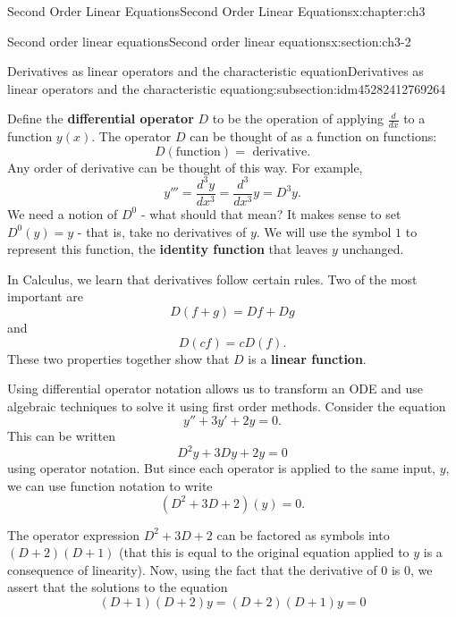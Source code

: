 \documentclass[oneside,10pt,]{book}
\newcommand{\terminology}[1]{\textbf{#1}}
\numberwithin{equation}{section}
\numberwithin{equation}{section}
\begin{document}
\begin{chapterptx}{Second Order Linear Equations}{}{Second Order Linear Equations}{}{}{x:chapter:ch3}
\begin{sectionptx}{Second order linear equations}{}{Second order linear equations}{}{}{x:section:ch3-2}
\begin{subsectionptx}{Derivatives as linear operators and the characteristic equation}{}{Derivatives as linear operators and the characteristic equation}{}{}{g:subsection:idm45282412769264}
\par
Define the \terminology{differential operator} \(D\) to be the operation of applying \(\frac{d}{dx}\) to a function \(y(x)\). The operator \(D\) can be thought of as a function on functions:%
\begin{equation*}
D(\text{function}) = \text{ derivative}.
\end{equation*}
Any order of derivative can be thought of this way. For example,%
\begin{equation*}
y''' = \frac{d^3 y}{dx^3} = \frac{d^3}{dx^3} y = D^3 y.
\end{equation*}
We need a notion of \(D^0\) - what should that mean? It makes sense to set \(D^0(y) = y\) - that is, take no derivatives of \(y\). We will use the symbol \(1\) to represent this function, the \terminology{identity function} that leaves \(y\) unchanged.%
\par
In Calculus, we learn that derivatives follow certain rules. Two of the most important are%
\begin{equation*}
D(f + g) = Df + Dg
\end{equation*}
and%
\begin{equation*}
D(cf) = cD(f).
\end{equation*}
These two properties together show that \(D\) is a \terminology{linear function}.%
\par
Using differential operator notation allows us to transform an ODE and use algebraic techniques to solve it using first order methods. Consider the equation%
\begin{equation*}
y'' + 3 y ' + 2 y = 0.
\end{equation*}
This can be written%
\begin{equation*}
D^2 y + 3 D y + 2 y = 0
\end{equation*}
using operator notation. But since each operator is applied to the same input, \(y\), we can use function notation to write%
\begin{equation*}
(D^2 + 3D + 2)(y) = 0.
\end{equation*}
%
\par
The operator expression \(D^2 + 3D + 2\) can be factored as symbols into \((D + 2)(D + 1)\) (that this is equal to the original equation applied to \(y\) is a consequence of linearity). Now, using the fact that the derivative of 0 is 0, we assert that the solutions to the equation%
\begin{equation*}
(D + 1)(D + 2)y = (D + 2)(D+1)y = 0
\end{equation*}

\end{subsectionptx}
\end{sectionptx}
\end{chapterptx}
\end{document}
